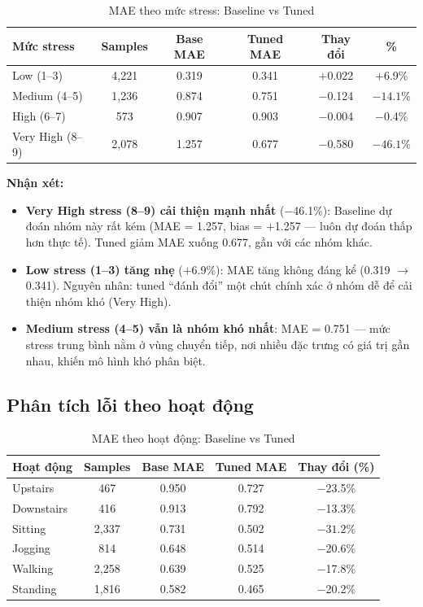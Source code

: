 \begin{table}[H]
\centering
\caption{MAE theo mức stress: Baseline vs Tuned}
\label{tab:error_by_stress}
\small
\begin{tabular}{|l|c|c|c|c|c|}
\hline
\textbf{Mức stress} & \textbf{Samples} & \textbf{Base MAE} & \textbf{Tuned MAE} & \textbf{Thay đổi} & \textbf{\%} \\
\hline
Low (1--3)       & 4{,}221 & 0.319 & 0.341 & $+$0.022 & $+$6.9\% \\
Medium (4--5)    & 1{,}236 & 0.874 & 0.751 & $-$0.124 & $\mathbf{-14.1\%}$ \\
High (6--7)      & 573     & 0.907 & 0.903 & $-$0.004 & $-$0.4\% \\
Very High (8--9) & 2{,}078 & 1.257 & 0.677 & $-$0.580 & $\mathbf{-46.1\%}$ \\
\hline
\end{tabular}
\end{table}

\textbf{Nhận xét:}
\begin{itemize}
    \item \textbf{Very High stress (8--9) cải thiện mạnh nhất} ($-$46.1\%): Baseline dự đoán nhóm này rất kém (MAE = 1.257, bias = $+$1.257 — luôn dự đoán thấp hơn thực tế). Tuned giảm MAE xuống 0.677, gần với các nhóm khác.
    \item \textbf{Low stress (1--3) tăng nhẹ} ($+$6.9\%): MAE tăng không đáng kể (0.319 $\to$ 0.341). Nguyên nhân: tuned ``đánh đổi'' một chút chính xác ở nhóm dễ để cải thiện nhóm khó (Very High).
    \item \textbf{Medium stress (4--5) vẫn là nhóm khó nhất}: MAE = 0.751 — mức stress trung bình nằm ở vùng chuyển tiếp, nơi nhiều đặc trưng có giá trị gần nhau, khiến mô hình khó phân biệt.
\end{itemize}

\subsection{Phân tích lỗi theo hoạt động}
\label{subsec:error_by_activity}

\begin{table}[H]
\centering
\caption{MAE theo hoạt động: Baseline vs Tuned}
\label{tab:error_by_activity}
\small
\begin{tabular}{|l|c|c|c|c|}
\hline
\textbf{Hoạt động} & \textbf{Samples} & \textbf{Base MAE} & \textbf{Tuned MAE} & \textbf{Thay đổi (\%)} \\
\hline
Upstairs    & 467   & 0.950 & 0.727 & $-$23.5\% \\
Downstairs  & 416   & 0.913 & 0.792 & $-$13.3\% \\
Sitting     & 2{,}337 & 0.731 & 0.502 & $\mathbf{-31.2\%}$ \\
Jogging     & 814   & 0.648 & 0.514 & $-$20.6\% \\
Walking     & 2{,}258 & 0.639 & 0.525 & $-$17.8\% \\
Standing    & 1{,}816 & 0.582 & 0.465 & $-$20.2\% \\
\hline
\end{tabular}
\end{table}

